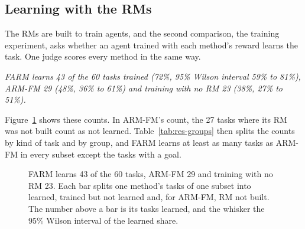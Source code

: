 \documentclass[11pt,english,listoffigures,listoftables]{tfgetsinf}
\newcommand{\keyidea}[1]{\par\smallskip\noindent\hspace*{0.6em}{\color{gray!55}\vrule width 1.5pt}\hspace{8pt}\parbox[t]{\dimexpr\linewidth-0.6em-9.5pt\relax}{\itshape #1}\par\smallskip}  %
\begin{document}
\subsection{Learning with the RMs}
\label{sec:res-learning}

The RMs are built to train agents, and the second comparison, the training experiment, asks whether an agent trained with each method's reward learns the task. One judge scores every method in the same way.

\keyidea{FARM learns 43 of the 60 tasks trained (72\%, 95\% Wilson interval 59\% to 81\%), ARM-FM 29 (48\%, 36\% to 61\%) and training with no RM 23 (38\%, 27\% to 51\%).}

\noindent Figure~\ref{fig:res-learned} shows these counts. In ARM-FM's count, the 27 tasks where its RM was not built count as not learned. Table~\ref{tab:res-groups} then splits the counts by kind of task and by group, and FARM learns at least as many tasks as ARM-FM in every subset except the tasks with a goal.

\begin{figure}[!htbp]
\centering

\caption[Tasks learned per method]{FARM learns 43 of the 60 tasks, ARM-FM 29 and training with no RM 23. Each bar splits one method's tasks of one subset into learned, trained but not learned and, for ARM-FM, RM not built. The number above a bar is its tasks learned, and the whisker the 95\% Wilson interval of the learned share.}
\label{fig:res-learned}
\end{figure}
\end{document}
